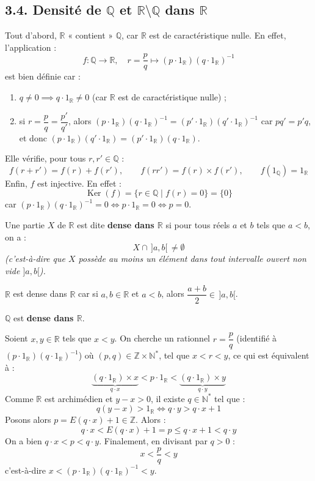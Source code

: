 \documentclass[a4paper,11pt]{article}
\newcommand{\R}{\mathbb{R}}
\newcommand{\N}{\mathbb{N}}
\newcommand{\Z}{\mathbb{Z}}
\newcommand{\Q}{\mathbb{Q}}
\DeclareMathOperator{\Ker}{Ker}
\newcommand{\mot}[1]{\textcolor{bordeaux}{\textbf{#1}}}
\begin{document}
\newpage
\subsection{3.4. Densité de $\Q$ et $\R \setminus \Q$ dans $\R$}

Tout d'abord, $\R$ « contient » $\Q$, car $\R$ est de caractéristique nulle. En effet, l'application :
\[
f : \Q \longrightarrow \R, \quad r = \frac{p}{q} \longmapsto (p \cdot 1_\R)(q \cdot 1_\R)^{-1}
\]
est bien définie car :
\begin{enumerate}
    \item $q \neq 0 \implies q \cdot 1_\R \neq 0$ (car $\R$ est de caractéristique nulle) ;
    \item si $r = \dfrac{p}{q} = \dfrac{p'}{q'}$, alors $(p \cdot 1_\R)(q \cdot 1_\R)^{-1} = (p' \cdot 1_\R)(q' \cdot 1_\R)^{-1}$ car $pq' = p'q$, et donc $(p \cdot 1_\R)(q' \cdot 1_\R) = (p' \cdot 1_\R)(q \cdot 1_\R)$.
\end{enumerate}

Elle vérifie, pour tous $r, r' \in \Q$ :
\[
f(r + r') = f(r) + f(r'), \qquad f(rr') = f(r) \times f(r'), \qquad f(1_\Q) = 1_\R
\]
Enfin, $f$ est injective. En effet :
\[
\Ker(f) = \{ r \in \Q \mid f(r) = 0 \} = \{ 0 \}
\]
car $(p \cdot 1_\R)(q \cdot 1_\R)^{-1} = 0 \iff p \cdot 1_\R = 0 \iff p = 0$.

\begin{definition}
Une partie $X$ de $\R$ est dite \mot{dense dans $\R$} si pour tous réels $a$ et $b$ tels que $a < b$, on a :
\[
X \cap \, ]a, b[ \, \neq \emptyset
\]
\textit{(c'est-à-dire que $X$ possède au moins un élément dans tout intervalle ouvert non vide $]a, b[$).}
\end{definition}

\begin{remarque}
$\R$ est dense dans $\R$ car si $a, b \in \R$ et $a < b$, alors $\dfrac{a + b}{2} \in \, ]a, b[$.
\end{remarque}

\begin{theoreme}[Densité de $\Q$ dans $\R$]
$\Q$ est \mot{dense dans $\R$}.
\end{theoreme}

\begin{demonstration}
Soient $x, y \in \R$ tels que $x < y$. On cherche un rationnel $r = \dfrac{p}{q}$ (identifié à $(p \cdot 1_\R)(q \cdot 1_\R)^{-1}$) où $(p, q) \in \Z \times \N^*$, tel que $x < r < y$, ce qui est équivalent à :
\[
\underbrace{(q \cdot 1_\R) \times x}_{q \cdot x} < p \cdot 1_\R < \underbrace{(q \cdot 1_\R) \times y}_{q \cdot y}
\]
Comme $\R$ est archimédien et $y - x > 0$, il existe $q \in \N^*$ tel que :
\[
q(y - x) > 1_\R \iff q \cdot y > q \cdot x + 1
\]
Posons alors $p = E(q \cdot x) + 1 \in \Z$. Alors :
\[
q \cdot x < E(q \cdot x) + 1 = p \le q \cdot x + 1 < q \cdot y
\]
On a bien $q \cdot x < p < q \cdot y$. Finalement, en divisant par $q > 0$ :
\[
x < \frac{p}{q} < y
\]
c'est-à-dire $x < (p \cdot 1_\R)(q \cdot 1_\R)^{-1} < y$.
\end{demonstration}
\end{document}
